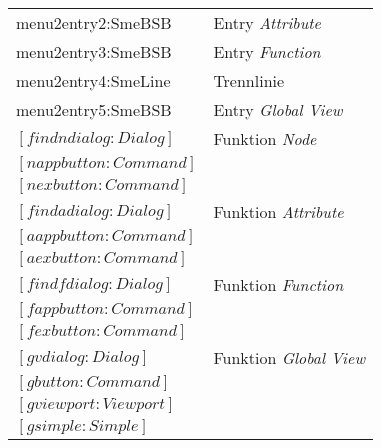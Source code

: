 \begin{tabular}{|l|l|}
\hspace{1.0cm}                        menu2entry2:SmeBSB         &     Entry {\it Attribute}                 \\
\hspace{1.0cm}                        menu2entry3:SmeBSB         &     Entry {\it Function}                 \\
\hspace{1.0cm}                        menu2entry4:SmeLine        &     Trennlinie                         \\
\hspace{1.0cm}                        menu2entry5:SmeBSB         &     Entry {\it Global View}                \\
\hspace{0.5cm}                $[findndialog:Dialog]$               &     Funktion {\it Node}                    \\
\hspace{1.0cm}                        $[nappbutton:Command]$       &                                       \\
\hspace{1.0cm}                        $[nexbutton:Command]$        &                                       \\
\hspace{0.5cm}                $[findadialog:Dialog]$               &     Funktion {\it Attribute}                \\
\hspace{1.0cm}                        $[aappbutton:Command]$       &                                        \\
\hspace{1.0cm}                        $[aexbutton:Command]$        &                                        \\
\hspace{0.5cm}                $[findfdialog:Dialog]$               &     Funktion {\it Function}                 \\
\hspace{1.0cm}                        $[fappbutton:Command]$       &                                       \\
\hspace{1.0cm}                        $[fexbutton:Command]$        &                                      \\
\hspace{0.5cm}                $[gvdialog:Dialog]$                  &     Funktion {\it Global View}            \\
\hspace{1.0cm}                        $[gbutton:Command]$          &                                      \\
\hspace{1.0cm}                        $[gviewport:Viewport]$       &                                      \\
\hspace{1.5cm}                                $[gsimple:Simple]$   &                                     \\
\hline
\end{tabular}

